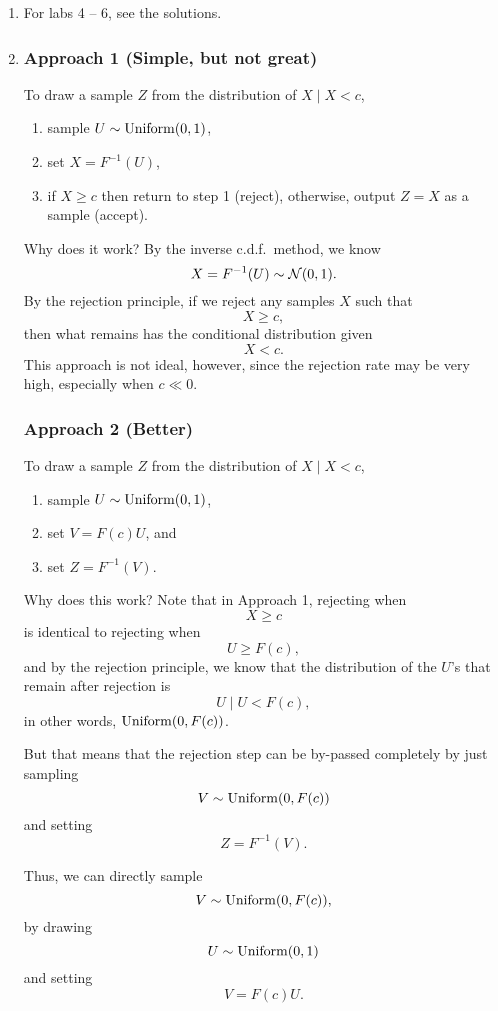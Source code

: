 \documentclass{article}
\begin{document}
\begin{enumerate}
\item For labs 4 -- 6, see the solutions. 

\item \subsubsection*{Approach 1 (Simple, but not great)}
To draw a sample $Z$ from the distribution of $X\mid X<c$,
\begin{enumerate}
    \item sample $U\sim \operatorname*{Uniform}(0,1)$,
    \item set $X = F^{-1}(U)$,
    \item if $X \geq c$ then return to step 1 (reject), otherwise, output $Z = X$ as a sample (accept).
\end{enumerate}
Why does it work? By the inverse c.d.f.\ method, we know $$X = F^{-1}(U)\sim\mathcal{N}(0,1).$$ By the rejection principle, if we reject any samples $X$
such that $$X\geq c,$$ then what remains has the conditional distribution given $$X<c.$$ This approach is not ideal, however, since the rejection rate may be very high, especially when $c\ll 0$.

\subsubsection*{Approach 2 (Better)}
To draw a sample $Z$ from the distribution of $X\mid X<c$,
\begin{enumerate}
    \item sample $U\sim \operatorname*{Uniform}(0,1)$,
    \item set $V = F(c)U$, and 
    \item set $Z = F^{-1}(V)$.
\end{enumerate}
Why does this work? Note that in Approach 1, rejecting when $$X\geq c$$ is identical to rejecting when $$U\geq F(c),$$ and by the rejection
principle, we know that the distribution of the $U$'s that remain after rejection is $$U\mid U<F(c),$$ in other words, $\operatorname*{Uniform}(0,F(c))$.  

But that means that the rejection step can be by-passed completely by just sampling $$V\sim\operatorname*{Uniform}(0,F(c))$$ and setting $$Z = F^{-1}(V).$$

Thus, we can directly sample $$V\sim\operatorname*{Uniform}(0,F(c)),$$ by drawing $$U\sim\operatorname*{Uniform}(0,1)$$ and setting $$V = F(c)U.$$ 




\end{enumerate}
\end{document}
